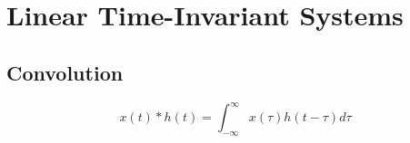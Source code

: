 \chapter{Linear Time-Invariant Systems}


\section{Convolution}
\[x(t) * h(t) = \int_{-\infty}^{\infty}x(\tau)h(t-\tau)d\tau\]